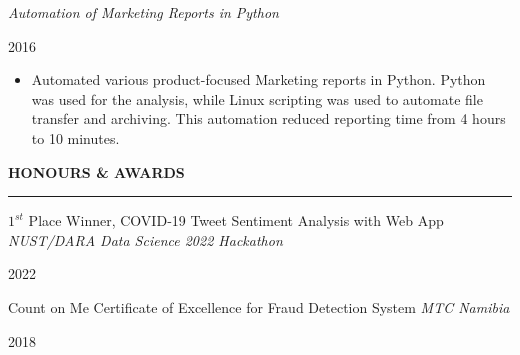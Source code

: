 \documentclass[
  letterpaper,
  DIV=11,
  numbers=noendperiod]{scrartcl}
\providecommand{\tightlist}{%
  \setlength{\itemsep}{0pt}\setlength{\parskip}{0pt}}\usepackage{longtable,booktabs,array}
\begin{document}
\vspace{5pt}

\begin{large}
  \begin{multicols}{2}
    \begin{flushleft}\textit{Automation of Marketing Reports in Python}\end{flushleft}
    \begin{flushright}2016\end{flushright}
  \end{multicols}
  \vspace{-0.17cm}
\end{large}

\begin{itemize}
\tightlist
\item
  Automated various product-focused Marketing reports in Python. Python
  was used for the analysis, while Linux scripting was used to automate
  file transfer and archiving. This automation reduced reporting time
  from 4 hours to 10 minutes.
\end{itemize}

\vspace{5pt}

\setlength{\columnsep}{-15.5cm}

\begin{large}
{\bf HONOURS \& AWARDS}
  \vspace{3pt}
  \hrule
  \begin{multicols}{2}
    \begin{flushleft}
      $1^{st}$ Place Winner, COVID‑19 Tweet Sentiment Analysis with Web App
      \textit{NUST/DARA Data Science 2022 Hackathon}
      \end{flushleft}
    \begin{flushright}2022\end{flushright}
  \end{multicols}
  \vspace{-0.04cm}
\end{large}

\begin{large}
  \begin{multicols}{2}
    \begin{flushleft}
      Count on Me Certificate of Excellence for Fraud Detection System
      \textit{MTC Namibia}
    \end{flushleft}
    \begin{flushright}2018\end{flushright}
  \end{multicols}
  \vspace{-0.01cm}
\end{large}
\end{document}
